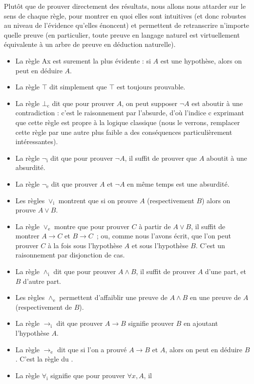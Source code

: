 Plutôt que de prouver directement des résultats, nous allons nous attarder sur
le sens de chaque règle, pour montrer en quoi elles sont intuitives (et donc
robustes au niveau de l'évidence qu'elles énoncent) et permettent de
retranscrire n'importe quelle preuve (en particulier, toute preuve en langage
naturel est virtuellement équivalente à un arbre de preuve en déduction
naturelle).
\begin{itemize}
\item La règle Ax est surement la plus évidente : si $A$ est une hypothèse,
  alors on peut en déduire $A$.
\item La règle $\top$ dit simplement que $\top$ est toujours prouvable.
\item La règle $\bot_\mathrm c$ dit que pour prouver $A$, on peut supposer
  $\lnot A$ est aboutir à une contradiction : c'est le raisonnement par
  l'absurde, d'où l'indice \og c\fg{} exprimant que cette règle est propre à la
  logique classique (nous le verrons, remplacer cette règle par une autre plus
  faible a des conséquences particulièrement intéressantes).
\item La règle $\lnot_\mathrm i$ dit que pour prouver $\lnot A$, il suffit de
  prouver que $A$ aboutit à une absurdité.
\item La règle $\lnot_\mathrm e$ dit que prouver $A$ et $\lnot A$ en même temps
  est une absurdité.
\item Les règles $\lor_\mathrm i$ montrent que si on prouve $A$ (respectivement
  $B$) alors on prouve $A\lor B$.
\item La règle $\lor_\mathrm e$ montre que pour prouver $C$ à partir de
  $A\lor B$, il suffit de montrer $A\to C$ et $B\to C$~; ou, comme nous
  l'avons écrit, que l'on peut prouver $C$ à la fois sous l'hypothèse $A$ et
  sous l'hypothèse $B$. C'est un raisonnement par disjonction de cas.
\item La règle $\land_\mathrm i$ dit que pour prouver $A\land B$, il suffit de
  prouver $A$ d'une part, et $B$ d'autre part.
\item Les règles $\land_\mathrm e$ permettent d'affaiblir une preuve de
  $A\land B$ en une preuve de $A$ (respectivement de $B$).
\item La règle $\to_\mathrm i$ dit que prouver $A\to B$ signifie prouver $B$ en
  ajoutant l'hypothèse $A$.
\item La règle $\to_\mathrm e$ dit que si l'on a prouvé $A\to B$ et $A$, alors on
  peut en déduire $B$. C'est la règle du .
\item La règle $\forall_\mathrm i$ signifie que pour prouver $\forall x, A$, il

\end{itemize}
